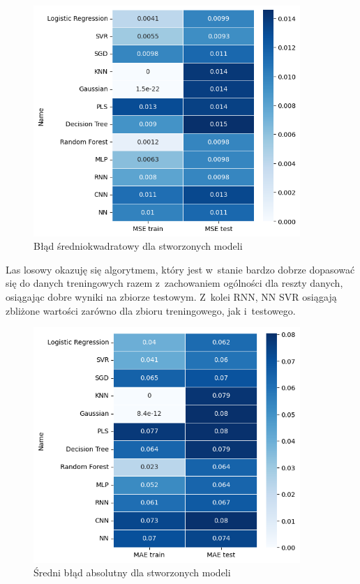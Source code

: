 \begin{figure}[H]
    \centering
    \includegraphics[width=0.9\textwidth]{images/mse.png}
    \caption[Błąd średniokwadratowy]{Błąd średniokwadratowy dla stworzonych modeli}
    \label{mse}
\end{figure}

Las losowy okazuję się algorytmem, który jest w~stanie bardzo dobrze 
dopasować się do danych treningowych razem z~zachowaniem ogólności dla 
reszty danych, osiągając dobre wyniki na zbiorze testowym. Z~kolei RNN, NN
SVR osiągają zbliżone wartości zarówno dla zbioru treningowego, jak i~testowego.

\begin{figure}[H]
    \centering
    \includegraphics[width=0.9\textwidth]{images/mae.png}
    \caption[Średni błąd absolutny]{Średni błąd absolutny dla stworzonych modeli}
    \label{mae}
\end{figure}

